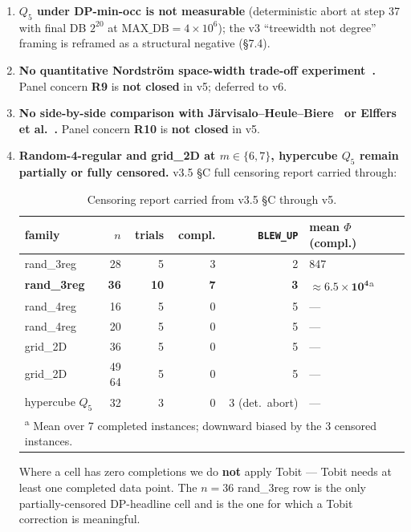 \documentclass[11pt,a4paper]{article}
\theoremstyle{remark}
\begin{document}
{\begin{enumerate}
\item \textbf{$Q_5$ under DP-min-occ is not measurable} (deterministic
abort at step 37 with final DB $2^{20}$ at $\mathrm{MAX\_DB} = 4 \times
10^6$); the v3 ``treewidth not degree'' framing is reframed as a
structural negative (\S7.4).

\item \textbf{No quantitative Nordstr\"om space-width trade-off
experiment~\cite{Nordstrom2013,Nordstrom2015survey}.} Panel concern
\textbf{R9} is \textbf{not closed} in v5; deferred to v6.

\item \textbf{No side-by-side comparison with
J\"arvisalo--Heule--Biere~\cite{JHB2012} or
Elffers et al.~\cite{Elffers2018}.} Panel concern \textbf{R10} is
\textbf{not closed} in v5.

\item \textbf{Random-4-regular and grid\_2D at $m \in \{6,7\}$, hypercube
$Q_5$ remain partially or fully censored.} v3.5 \S C full censoring
report carried through:

\begin{table}[!htbp]
\centering
\footnotesize
\begin{tabular}{@{}lrrrr>{\raggedleft\arraybackslash}p{3.4cm}@{}}
\toprule
family & $n$ & trials & compl. & \texttt{BLEW\_UP} & mean $\Phi$ (compl.) \\
\midrule
rand\_3reg & 28 & 5 & 3 & 2 & 19{,}847 \\
\textbf{rand\_3reg} & \textbf{36} & \textbf{10} & \textbf{7} & \textbf{3}
& $\bm{\approx 6.5{\times}10^4}$\textsuperscript{a} \\
rand\_4reg & 16 & 5 & 0 & 5 & --- \\
rand\_4reg & 20 & 5 & 0 & 5 & --- \\
grid\_2D & 36 & 5 & 0 & 5 & --- \\
grid\_2D & \makecell{49\\64} & 5 & 0 & 5 & --- \\
hypercube $Q_5$ & 32 & 3 & 0 & 3 (det.\ abort) & --- \\
\multicolumn{6}{l}{\footnotesize\textsuperscript{a} Mean over 7 completed instances; downward biased by the 3 censored instances.} \\
\bottomrule
\end{tabular}
\caption{Censoring report carried from v3.5 \S C through v5.}
\label{tab:censoring}
\end{table}

Where a cell has zero completions we do \textbf{not} apply Tobit ---
Tobit needs at least one completed data point. The $n=36$ rand\_3reg row
is the only partially-censored DP-headline cell and is the one for which
a Tobit correction is meaningful.


\end{enumerate}}
\end{document}

